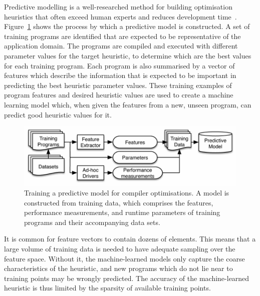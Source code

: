 Predictive modelling is a well-researched method for building optimisation heuristics that often exceed human experts and reduces development time~\cite{Micolet2016,Wang2014c,Magni2014,Cummins2016,Wang2009,Wen2015,Wang2010,Falch2015,Collins2012,Leather2014,Ogilvie2014a}. Figure~\ref{fig:training-a-predictive-model} shows the process by which a predictive model is constructed. A set of training programs are identified that are expected to be representative of the application domain. The programs are compiled and executed with different parameter values for the target heuristic, to determine which are the best values for each training program. Each program is also summarised by a vector of features which describe the information that is expected to be important in predicting the best heuristic parameter values. These training examples of program features and desired heuristic values are used to create a machine learning model which, when given the features from a new, unseen program, can predict good heuristic values for it.

\begin{figure}
  \includegraphics[width=0.9\columnwidth]{img/overview-a}%
  \caption[Training a predictive model for compiler optimisations]{%
    Training a predictive model for compiler optimisations. A model is constructed from training data, which comprises the features, performance measurements, and runtime parameters of training programs and their accompanying data sets.%
  }%
  \label{fig:training-a-predictive-model}
\end{figure}

It is common for feature vectors to contain dozens of elements. This means that a large volume of training data is needed to have adequate sampling over the feature space. Without it, the machine-learned models only capture the coarse characteristics of the heuristic, and new programs which do not lie near to training points may be wrongly predicted. The accuracy of the machine-learned heuristic is thus limited by the sparsity of available training points.

